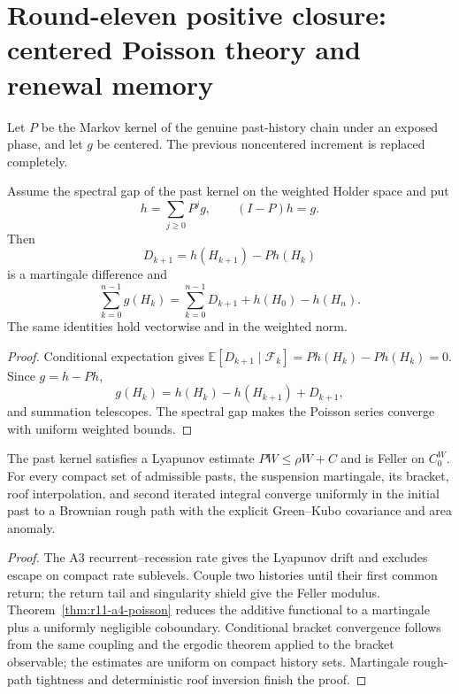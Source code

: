 \section{Round-eleven positive closure: centered Poisson theory and renewal memory}
\label{sec:r11-a4}

Let $P$ be the Markov kernel of the genuine past-history chain under an
exposed phase, and let $g$ be centered.  The previous noncentered increment is
replaced completely.

\begin{theorem}
\label{thm:r11-a4-poisson}
Assume the spectral gap of the past kernel on the weighted Holder space and
put
\[
 h=\sum_{j\ge0}P^jg,
 \qquad (I-P)h=g.
\]
Then
\[
 D_{k+1}=h(H_{k+1})-Ph(H_k)
\]
is a martingale difference and
\[
 \sum_{k=0}^{n-1}g(H_k)
 =\sum_{k=0}^{n-1}D_{k+1}+h(H_0)-h(H_n).
\]
The same identities hold vectorwise and in the weighted norm.
\end{theorem}

\begin{proof}
Conditional expectation gives
$\mathbb E[D_{k+1}\mid\mathcal F_k]=Ph(H_k)-Ph(H_k)=0$.
Since $g=h-Ph$,
\[
 g(H_k)=h(H_k)-h(H_{k+1})+D_{k+1},
\]
and summation telescopes.  The spectral gap makes the Poisson series converge
with uniform weighted bounds.
\end{proof}

\begin{theorem}
\label{thm:r11-a4-quenched}
The past kernel satisfies a Lyapunov estimate $PW\le\rho W+C$ and is Feller
on $C_0^W$.  For every compact set of admissible pasts, the suspension
martingale, its bracket, roof interpolation, and second iterated integral
converge uniformly in the initial past to a Brownian rough path with the
explicit Green--Kubo covariance and area anomaly.
\end{theorem}

\begin{proof}
The A3 recurrent--recession rate gives the Lyapunov drift and excludes escape
on compact rate sublevels.  Couple two histories until their first common
return; the return tail and singularity shield give the Feller modulus.
Theorem~\ref{thm:r11-a4-poisson} reduces the additive functional to a
martingale plus a uniformly negligible coboundary.  Conditional bracket
convergence follows from the same coupling and the ergodic theorem applied to
the bracket observable; the estimates are uniform on compact history sets.
Martingale rough-path tightness and deterministic roof inversion finish the
proof.
\end{proof}

